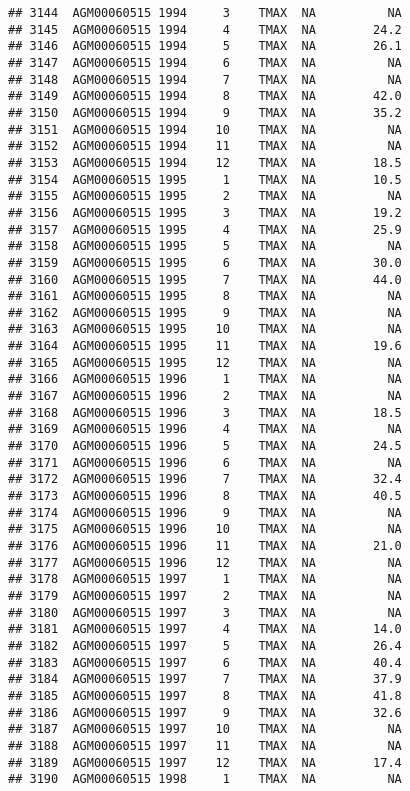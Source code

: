 \documentclass{article}\usepackage[]{graphicx}\usepackage[]{color}
\makeatletter
\newenvironment{kframe}{%
 \def\at@end@of@kframe{}%
 \ifinner\ifhmode%
  \def\at@end@of@kframe{\end{minipage}}%
  \begin{minipage}{\columnwidth}%
 \fi\fi%
 \def\FrameCommand##1{\hskip\@totalleftmargin \hskip-\fboxsep
 \colorbox{shadecolor}{##1}\hskip-\fboxsep
     \hskip-\linewidth \hskip-\@totalleftmargin \hskip\columnwidth}%
 \MakeFramed {\advance\hsize-\width
   \@totalleftmargin\z@ \linewidth\hsize
   \@setminipage}}%
 {\par\unskip\endMakeFramed%
 \at@end@of@kframe}
\newenvironment{knitrout}{}{} %
\makeatother
\begin{document}
\begin{knitrout}
\begin{kframe}
\begin{verbatim}
## 3144  AGM00060515 1994     3    TMAX  NA          NA
## 3145  AGM00060515 1994     4    TMAX  NA        24.2
## 3146  AGM00060515 1994     5    TMAX  NA        26.1
## 3147  AGM00060515 1994     6    TMAX  NA          NA
## 3148  AGM00060515 1994     7    TMAX  NA          NA
## 3149  AGM00060515 1994     8    TMAX  NA        42.0
## 3150  AGM00060515 1994     9    TMAX  NA        35.2
## 3151  AGM00060515 1994    10    TMAX  NA          NA
## 3152  AGM00060515 1994    11    TMAX  NA          NA
## 3153  AGM00060515 1994    12    TMAX  NA        18.5
## 3154  AGM00060515 1995     1    TMAX  NA        10.5
## 3155  AGM00060515 1995     2    TMAX  NA          NA
## 3156  AGM00060515 1995     3    TMAX  NA        19.2
## 3157  AGM00060515 1995     4    TMAX  NA        25.9
## 3158  AGM00060515 1995     5    TMAX  NA          NA
## 3159  AGM00060515 1995     6    TMAX  NA        30.0
## 3160  AGM00060515 1995     7    TMAX  NA        44.0
## 3161  AGM00060515 1995     8    TMAX  NA          NA
## 3162  AGM00060515 1995     9    TMAX  NA          NA
## 3163  AGM00060515 1995    10    TMAX  NA          NA
## 3164  AGM00060515 1995    11    TMAX  NA        19.6
## 3165  AGM00060515 1995    12    TMAX  NA          NA
## 3166  AGM00060515 1996     1    TMAX  NA          NA
## 3167  AGM00060515 1996     2    TMAX  NA          NA
## 3168  AGM00060515 1996     3    TMAX  NA        18.5
## 3169  AGM00060515 1996     4    TMAX  NA          NA
## 3170  AGM00060515 1996     5    TMAX  NA        24.5
## 3171  AGM00060515 1996     6    TMAX  NA          NA
## 3172  AGM00060515 1996     7    TMAX  NA        32.4
## 3173  AGM00060515 1996     8    TMAX  NA        40.5
## 3174  AGM00060515 1996     9    TMAX  NA          NA
## 3175  AGM00060515 1996    10    TMAX  NA          NA
## 3176  AGM00060515 1996    11    TMAX  NA        21.0
## 3177  AGM00060515 1996    12    TMAX  NA          NA
## 3178  AGM00060515 1997     1    TMAX  NA          NA
## 3179  AGM00060515 1997     2    TMAX  NA          NA
## 3180  AGM00060515 1997     3    TMAX  NA          NA
## 3181  AGM00060515 1997     4    TMAX  NA        14.0
## 3182  AGM00060515 1997     5    TMAX  NA        26.4
## 3183  AGM00060515 1997     6    TMAX  NA        40.4
## 3184  AGM00060515 1997     7    TMAX  NA        37.9
## 3185  AGM00060515 1997     8    TMAX  NA        41.8
## 3186  AGM00060515 1997     9    TMAX  NA        32.6
## 3187  AGM00060515 1997    10    TMAX  NA          NA
## 3188  AGM00060515 1997    11    TMAX  NA          NA
## 3189  AGM00060515 1997    12    TMAX  NA        17.4
## 3190  AGM00060515 1998     1    TMAX  NA          NA

\end{verbatim}
\end{kframe}
\end{knitrout}
\end{document}
